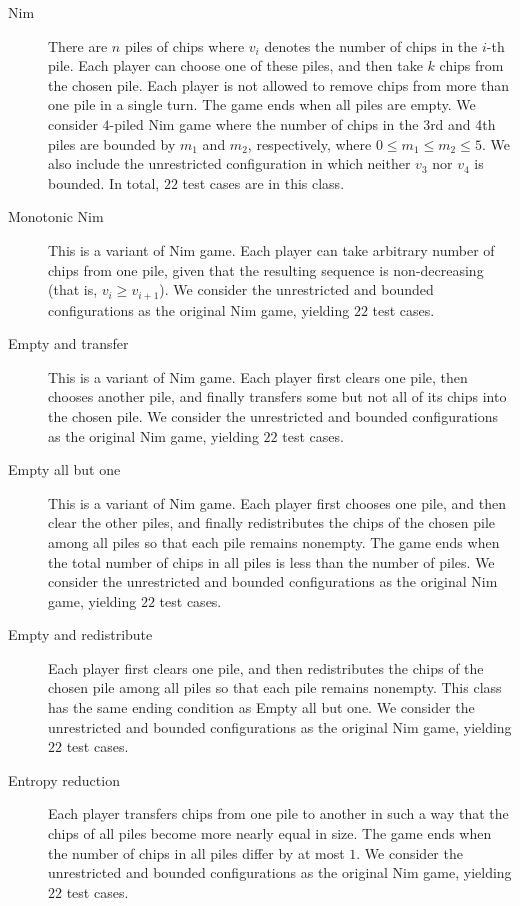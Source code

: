 \documentclass[review]{elsarticle}
\begin{document}
\begin{description}
	\item[Nim] There are $n$ piles of chips where $v_i$ denotes the number of chips in the $i$-th pile.
	Each player can choose one of these piles, and then take $k$ chips from the chosen pile. 
	Each player is not allowed to remove chips from more than one pile in a single turn.
	The game ends when all piles are empty.
	We consider $4$-piled Nim game where the number of chips in the 3rd and 4th piles are bounded by $m_1$ and $m_2$, respectively, where $0 \leq m_1 \leq m_2 \leq 5$.
	We also include the unrestricted configuration in which neither $v_3$ nor $v_4$ is bounded.
	In total, $22$ test cases are in this class.
	
	\item[Monotonic Nim]
	This is a variant of Nim game.
	Each player can take arbitrary number of chips from one pile, given that the resulting sequence is non-decreasing (that is, $v_{i} \ge v_{i + 1}$). 	
	We consider the unrestricted and bounded configurations as the original	Nim game, yielding $22$ test cases.
		
	\item[Empty and transfer]
	This is a variant of Nim game.
	Each player first clears one pile, then chooses another pile, and finally transfers some but not all of its chips into the chosen pile.
	We consider the unrestricted and bounded configurations as the original	Nim game, yielding $22$ test cases.
	
	\item[Empty all but one]
	This is a variant of Nim game.
	Each player first chooses one pile, and then clear the other piles, and finally redistributes the chips of the chosen pile among all piles so that each pile remains nonempty.
	The game ends when the total number of chips in all piles is less than the number of piles.
	We consider the unrestricted and bounded configurations as the original	Nim game, yielding $22$ test cases.
	
	\item[Empty and redistribute]
	Each player first clears one pile, and then redistributes the chips of the chosen pile among all piles so that each pile remains nonempty.
	This class has the same ending condition as Empty all but one.
	We consider the unrestricted and bounded configurations as the original	Nim game, yielding $22$ test cases.
	
	\item[Entropy reduction]
	Each player transfers chips from one pile to another in such a way that the chips of all piles become more nearly equal in size.
	The game ends when the number of chips in all piles differ by at most $1$.
	We consider the unrestricted and bounded configurations as the original	Nim game, yielding $22$ test cases.
	

\end{description}
\end{document}
